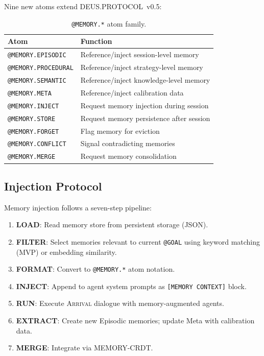 \documentclass[11pt,a4paper]{article}
\newcommand{\arrival}{\textsc{Arrival}\xspace}
\begin{document}
Nine new atoms extend DEUS.PROTOCOL~v0.5:

\begin{table}[H]
\centering\small
\caption{\texttt{@MEMORY.*} atom family.}\label{tab:memoryatoms}
\begin{tabular}{@{}ll@{}}
\toprule
\textbf{Atom} & \textbf{Function} \\
\midrule
\texttt{@MEMORY.EPISODIC}   & Reference/inject session-level memory \\
\texttt{@MEMORY.PROCEDURAL} & Reference/inject strategy-level memory \\
\texttt{@MEMORY.SEMANTIC}   & Reference/inject knowledge-level memory \\
\texttt{@MEMORY.META}       & Reference/inject calibration data \\
\texttt{@MEMORY.INJECT}     & Request memory injection during session \\
\texttt{@MEMORY.STORE}      & Request memory persistence after session \\
\texttt{@MEMORY.FORGET}     & Flag memory for eviction \\
\texttt{@MEMORY.CONFLICT}   & Signal contradicting memories \\
\texttt{@MEMORY.MERGE}      & Request memory consolidation \\
\bottomrule
\end{tabular}
\end{table}

\subsection{Injection Protocol}

Memory injection follows a seven-step pipeline:
\begin{enumerate}
  \item \textbf{LOAD}: Read memory store from persistent storage (JSON).
  \item \textbf{FILTER}: Select memories relevant to current
    \texttt{@GOAL} using keyword matching (MVP) or embedding similarity.
  \item \textbf{FORMAT}: Convert to \texttt{@MEMORY.*} atom notation.
  \item \textbf{INJECT}: Append to agent system prompts as
    \texttt{[MEMORY CONTEXT]} block.
  \item \textbf{RUN}: Execute \arrival dialogue with memory-augmented
    agents.
  \item \textbf{EXTRACT}: Create new Episodic memories; update Meta
    with calibration data.
  \item \textbf{MERGE}: Integrate via MEMORY-CRDT.
\end{enumerate}
\end{document}
